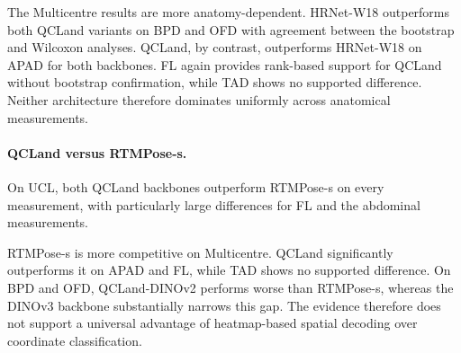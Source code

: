 The Multicentre results are more anatomy-dependent. HRNet-W18
outperforms both QCLand variants on BPD and OFD with agreement between
the bootstrap and Wilcoxon analyses. QCLand, by contrast, outperforms
HRNet-W18 on APAD for both backbones. FL again provides rank-based
support for QCLand without bootstrap confirmation, while TAD shows no
supported difference. Neither architecture therefore dominates
uniformly across anatomical measurements.

\paragraph{QCLand versus RTMPose-s.}
On UCL, both QCLand backbones outperform RTMPose-s on every
measurement, with particularly large differences for FL and the
abdominal measurements.

RTMPose-s is more competitive on Multicentre. QCLand significantly
outperforms it on APAD and FL, while TAD shows no supported
difference. On BPD and OFD, QCLand-DINOv2 performs worse than
RTMPose-s, whereas the DINOv3 backbone substantially narrows this gap.
The evidence therefore does not support a universal advantage of
heatmap-based spatial decoding over coordinate classification.

